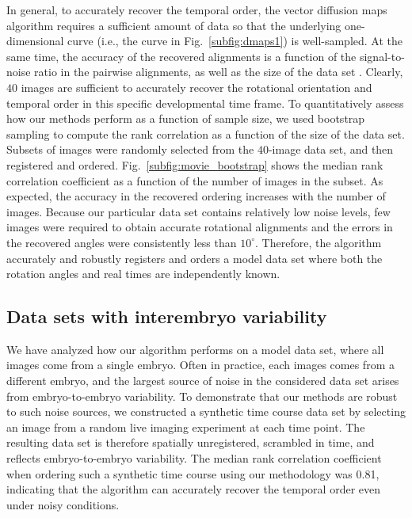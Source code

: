 \documentclass{pnastwo}
\newcommand{\fig}[0]{Fig.}
\begin{document}
\begin{article}
In general, to accurately recover the temporal order, the vector diffusion maps algorithm requires a sufficient amount of data so that the underlying one-dimensional curve (i.e., the curve in \fig~\ref{subfig:dmaps1}) is well-sampled.
%
At the same time, the accuracy of the recovered alignments is a function of the signal-to-noise ratio in the pairwise alignments, as well as the size of the data set \cite{singer2011angular}.
%
Clearly, $40$ images are sufficient to accurately recover the rotational orientation and temporal order  in this specific developmental time frame.
%
To quantitatively assess how our methods perform as a function of sample size, we used bootstrap sampling to compute the rank correlation as a function of the size of the data set.
%
Subsets of images were randomly selected from the $40$-image data set, and then registered and ordered. 
%
\fig~\ref{subfig:movie_bootstrap} shows the median rank correlation coefficient as a function of the number of images in the subset.
%
As expected, the accuracy in the recovered ordering increases with the number of images. 
%
Because our particular data set contains relatively low noise levels, few images were required to obtain accurate rotational alignments and the errors in the recovered angles were consistently less than $10^{\circ}$.
%
Therefore, the algorithm accurately and robustly registers and orders a model data set where both the rotation angles and real times are independently known. 


\subsection{Data sets with interembryo variability}

We have analyzed how our algorithm performs on a model data set, where all images come from a single embryo. 
%
Often in practice, each images comes from a different embryo, and the largest source of noise in the considered data set arises from embryo-to-embryo variability.
%
To demonstrate that our methods are robust to such noise sources,
we constructed a synthetic time course data set by selecting an image from a random live imaging experiment at each time point.
%
The resulting data set is therefore spatially unregistered, scrambled in time, and reflects embryo-to-embryo variability. 
%
The median rank correlation coefficient when ordering such a synthetic time course using our methodology was 0.81, indicating that the algorithm can accurately recover the temporal order even under noisy conditions. 


\end{article}
\end{document}
